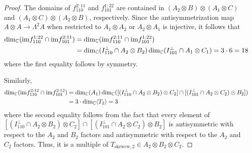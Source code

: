 \documentclass[12pt]{amsart}
\theoremstyle{definition}
\theoremstyle{remark}
\theoremstyle{definition}
\newcommand{\CC}{\mathbb{C}}
\begin{document}
\begin{proof}
The domains of $f_{110}^{2:11}$ and $f_{101}^{1:22}$ are contained in $(A_2\otimes B) \otimes (A_1 \otimes C)$ and $(A_1\otimes C) \otimes (A_2\otimes B)$, respectively. Since the antisymmetrization map $A\otimes A\to \Lambda^2 A$ when restricted to $A_1\otimes A_2$ or $A_2\otimes A_1$ is injective, it follows that 
\begin{align}
    \dim_\CC (\mathrm{im} f_{110}^{1:22} \cap \mathrm{im} f_{101}^{2:11}) &= \dim_\CC (\mathrm{im} f_{110}^{2:11} \cap \mathrm{im} f_{101}^{1:22}) \notag \\
    &= \dim_\CC (I_{110}^\perp\cap A_2\otimes B_2)\dim_\CC (I_{101}^\perp \cap A_1\otimes C_1) = 3\cdot 6 = 18 \label{eq:2:11}
\end{align}
where the first equality follows by symmetry.

Similarly,
\begin{align}\label{eq:2:12}
   \dim_\CC(\mathrm{im} f_{110}^{2:12} \cap \mathrm{im} f_{101}^{2:12}) &= \dim_\CC (A_1)  \dim_\CC ([(I_{110}^\perp\cap A_2\otimes B_2)\otimes C_2] \cap [(I_{101}^\perp\cap A_2\otimes C_2)\otimes B_2]) 
   \notag \\
   &= 3\cdot \dim_\CC \langle T_2\rangle  = 3
\end{align}
where the second equality follows from the fact that every element of $[(I_{110}^\perp\cap A_2\otimes B_2)\otimes C_2] \cap [(I_{101}^\perp\cap A_2\otimes C_2)\otimes B_2]$ is antisymmetric with respect to the $A_2$ and $B_2$ factors and antisymmetric with respect to the $A_2$ and $C_2$ factors. Thus, it is a multiple of $T_{\mathrm{skewcw},2}\in A_2\otimes B_2\otimes C_2$.





\end{proof}
\end{document}
